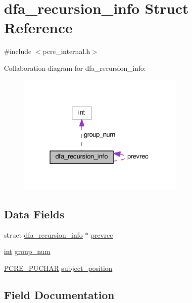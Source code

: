 \hypertarget{structdfa__recursion__info}{}\section{dfa\+\_\+recursion\+\_\+info Struct Reference}
\label{structdfa__recursion__info}


{\ttfamily \#include $<$pcre\+\_\+internal.\+h$>$}



Collaboration diagram for dfa\+\_\+recursion\+\_\+info\+:
\nopagebreak
\begin{figure}[H]
\begin{center}
\leavevmode
\includegraphics[width=230pt]{structdfa__recursion__info__coll__graph}
\end{center}
\end{figure}
\subsection*{Data Fields}
\begin{DoxyCompactItemize}
\item 
struct \hyperlink{structdfa__recursion__info}{dfa\+\_\+recursion\+\_\+info} $\ast$ \hyperlink{structdfa__recursion__info_afd275b66e5b52edf74a7e7cb1f9ea625}{prevrec}
\item 
\hyperlink{pcre_8txt_a42dfa4ff673c82d8efe7144098fbc198}{int} \hyperlink{structdfa__recursion__info_a8014a7c394cc2a84dea59e56a27e4878}{group\+\_\+num}
\item 
\hyperlink{pcre__internal_8h_a142c7c692c1f94083b0ad52e0520e900}{P\+C\+R\+E\+\_\+\+P\+U\+C\+H\+AR} \hyperlink{structdfa__recursion__info_a02acd67944a3cd415532136ba40f0b0b}{subject\+\_\+position}
\end{DoxyCompactItemize}


\subsection{Field Documentation}
